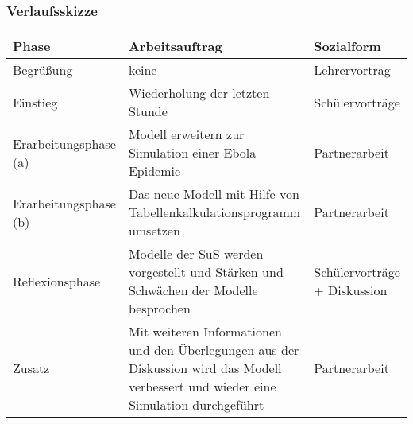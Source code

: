 \begin{landscape}
\subsubsection{Verlaufsskizze}
\noindent
\begin{tabular}{|C{0.3\textwidth}|L{0.8\textwidth}|L{0.4\textwidth}|}
\hline
Phase & Arbeitsauftrag & Sozialform\\
\hline\hline
Begrüßung & keine & Lehrervortrag\\
\hline
Einstieg & Wiederholung der letzten Stunde & Schülervorträge\\
\hline
Erarbeitungsphase (a) & Modell erweitern zur Simulation einer Ebola Epidemie & Partnerarbeit\\
\hline
Erarbeitungsphase (b) & Das neue Modell mit Hilfe von Tabellenkalkulationsprogramm umsetzen & Partnerarbeit\\
\hline
Reflexionsphase & Modelle der SuS werden vorgestellt und Stärken und Schwächen der Modelle besprochen & Schülervorträge + Diskussion\\
\hline
Zusatz & Mit weiteren Informationen und den Überlegungen aus der Diskussion wird das Modell verbessert und wieder eine Simulation durchgeführt & Partnerarbeit\\
\hline
\end{tabular}
\end{landscape}